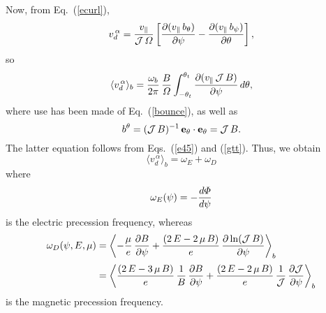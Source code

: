 \documentclass[12pt,prb,aps,notitlepage]{revtex4-1}
\begin{document}
 Now, from Eq.~(\ref{ecurl}), 
 \begin{equation}
 v_d^{\,\alpha}= \frac{v_\parallel}{{\cal J}\,{\mit\Omega}}\left[\frac{\partial (v_\parallel\,b_\theta)}{\partial\psi} - \frac{\partial (v_\parallel\,b_\psi)}{\partial \theta}\right],
 \end{equation}
 so
 \begin{equation}
 \langle v_d^{\,\alpha}\rangle_b = \frac{\omega_b}{2\pi}\,\frac{B}{{\mit\Omega}}\int_{-\theta_t}^{\theta_t}\frac{\partial (v_\parallel\,{\cal J}\,B)}{\partial\psi}\,d\theta,
 \end{equation}
 where use has been made of Eq.~(\ref{bounce}), as well as 
 \begin{equation}
 b^\theta = ({\cal J}\,B)^{-1}\,{\bf e}_\theta\cdot{\bf e}_\theta= {\cal J}\,B.
 \end{equation}
 The latter equation follows from Eqs.~(\ref{e45}) and (\ref{gtt}). Thus, we obtain 
 \begin{equation}\label{e98}
  \langle v_d^{\,\alpha}\rangle_b=\omega_E +\omega_D
 \end{equation}
 where 
 \begin{equation}
 \omega_E(\psi)= -\frac{d{\mit\Phi}}{d\psi}
 \end{equation}
 is the  electric precession frequency, whereas 
 \begin{align}
 \omega_D(\psi,E,\mu)&=\left\langle- \frac{\mu}{e}\,\frac{\partial B}{\partial\psi} +\frac{(2\,E-2\,\mu\,B)}{e}\,\frac{\partial \ln({\cal J}\,B)}{\partial\psi}
 \right\rangle_b\nonumber\\[0.5ex]
 &=\left\langle\frac{(2\,E-3\,\mu\,B)}{e}\,\frac{1}{B}\,\frac{\partial B}{\partial\psi} +\frac{(2\,E-2\,\mu\,B)}{e}\,\frac{1}{\cal J}\,\frac{\partial{\cal J}}{\partial\psi}
 \right\rangle_b
 \end{align}
 is the magnetic precession frequency. 
 
\end{document}
